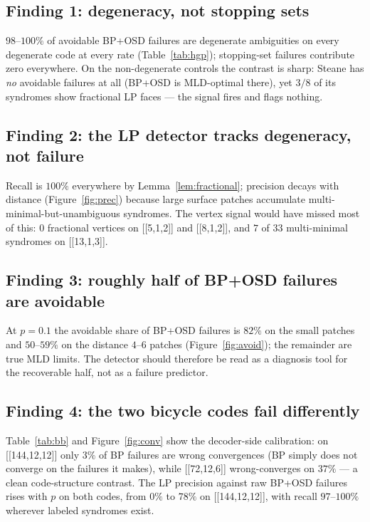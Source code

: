 \documentclass[10pt]{article}
\begin{document}
\subsection{Finding 1: degeneracy, not stopping sets}

$98$--$100\%$ of avoidable BP+OSD failures are degenerate ambiguities
on every degenerate code at every rate (Table~\ref{tab:hgp});
stopping-set failures contribute zero everywhere. On the non-degenerate
controls the contrast is sharp: Steane has \emph{no} avoidable failures
at all (BP+OSD is MLD-optimal there), yet $3/8$ of its syndromes show
fractional LP faces --- the signal fires and flags nothing.

\subsection{Finding 2: the LP detector tracks degeneracy, not failure}

Recall is $100\%$ everywhere by Lemma~\ref{lem:fractional}; precision
decays with distance (Figure~\ref{fig:prec}) because large surface
patches accumulate multi-minimal-but-unambiguous syndromes. The vertex
signal would have missed most of this: $0$ fractional vertices on
[[5,1,2]] and [[8,1,2]], and $7$ of $33$ multi-minimal syndromes on
[[13,1,3]].

\subsection{Finding 3: roughly half of BP+OSD failures are avoidable}

At $p = 0.1$ the avoidable share of BP+OSD failures is $82\%$ on the
small patches and $50$--$59\%$ on the distance $4$--$6$ patches
(Figure~\ref{fig:avoid}); the remainder are true MLD limits. The
detector should therefore be read as a diagnosis tool for the
recoverable half, not as a failure predictor.

\subsection{Finding 4: the two bicycle codes fail differently}

Table~\ref{tab:bb} and Figure~\ref{fig:conv} show the decoder-side
calibration: on [[144,12,12]] only $3\%$ of BP failures are wrong
convergences (BP simply does not converge on the failures it makes),
while [[72,12,6]] wrong-converges on $37\%$ --- a clean
code-structure contrast. The LP precision against raw BP+OSD failures
rises with $p$ on both codes, from $0\%$ to $78\%$ on [[144,12,12]],
with recall $97$--$100\%$ wherever labeled syndromes exist.
\end{document}
